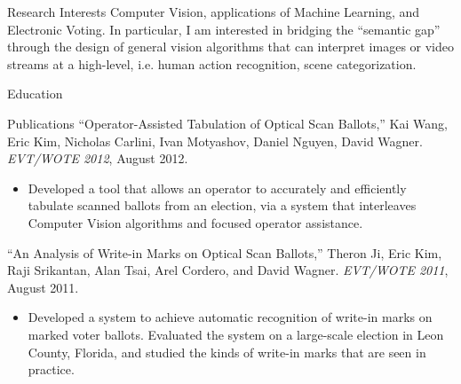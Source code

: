 \documentclass{resume}
\begin{document}
\maketitle
\thispagestyle{empty} %

\vspace{-0.5em}

\begin{component}{Research Interests}
Computer Vision, applications of Machine Learning, and Electronic Voting.
In particular, I am interested in bridging the ``semantic gap'' through the
design of general vision algorithms that can interpret images or video streams at
a high-level, i.e. human action recognition, scene categorization.
\end{component}

\begin{component}{Education}
\end{component}

\begin{component}{Publications}
\vspace{0.5em}
``Operator-Assisted Tabulation of Optical Scan Ballots,'' Kai Wang, Eric Kim, Nicholas Carlini, Ivan Motyashov, Daniel Nguyen, David Wagner. \emph{EVT/WOTE 2012}, August 2012.
        \begin{itemize}
        \vspace{-0.5em}\item[] Developed a tool that allows an operator
to accurately and efficiently tabulate scanned ballots from an election,
via a system that interleaves Computer Vision algorithms and focused
operator assistance.
        \end{itemize}

``An Analysis of Write-in Marks on Optical Scan Ballots,'' Theron Ji, Eric Kim, Raji Srikantan, Alan Tsai, Arel Cordero, and David Wagner. \emph{EVT/WOTE 2011}, August 2011.
	\begin{itemize}
	\vspace{-0.5em}\item[] Developed a system to achieve automatic recognition of write-in marks on marked voter ballots. Evaluated the system on
				       a large-scale election in Leon County, Florida, and studied the kinds of write-in marks that are seen in practice.
	\end{itemize}
\end{component}
\end{document}
